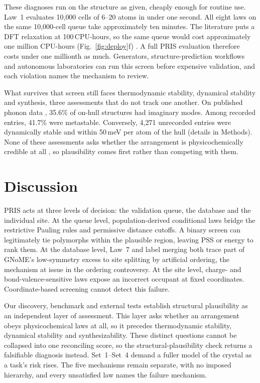 These diagnoses run on the structure as given, cheaply enough for routine use. Law~1
evaluates 10{,}000 cells of 6--20 atoms in under one second. All eight laws on the
same 10{,}000-cell queue take approximately ten minutes. The literature puts a DFT relaxation at 100\,CPU-hours, so the same queue
would cost approximately one million CPU-hours
(Fig.~\ref{fig:deploy}f) \cite{jain2013commentary}. A full PRIS evaluation therefore costs
under one millionth as much. Generators, structure-prediction workflows and autonomous
laboratories can run this screen before expensive validation, and each violation names the
mechanism to review.

What survives that screen still faces thermodynamic stability, dynamical stability and
synthesis, three assessments that do not track one another. On published phonon data
\cite{petretto2018highthroughput,zhu2024highthroughput}, 35.6\% of on-hull structures had
imaginary modes. Among recorded entries, 41.7\% were metastable. Conversely, 4{,}271
unrecorded entries were dynamically stable and within 50\,meV per atom of the hull (details in Methods).
None of these assessments asks whether the arrangement is physicochemically credible at all
\cite{sun2016thermodynamic,aykol2018thermodynamic,antoniuk2023predicting}, so plausibility
comes first rather than competing with them.

\section{Discussion}
\label{sec:ledger}

PRIS acts at three levels of decision: the validation queue, the database and the
individual site. At the queue level, population-derived conditional laws bridge the
restrictive Pauling rules and permissive distance cutoffs. A binary screen can legitimately
tie polymorphs within the plausible region, leaving PSS or energy to rank them. At the database
level, Law~7 and label merging both trace part of GNoME's low-symmetry excess to site
splitting by artificial ordering, the mechanism at issue in the ordering
controversy. At the site level, charge- and bond-valence-sensitive laws expose an incorrect
occupant at fixed coordinates. Coordinate-based screening cannot detect this failure.

Our discovery, benchmark and external tests establish structural plausibility as
an independent layer of assessment. This layer asks whether an arrangement obeys
physicochemical laws at all, so it precedes thermodynamic stability, dynamical
stability and synthesizability. These distinct questions cannot be collapsed into one
reconciling score, so the structural-plausibility check returns a falsifiable diagnosis instead.
Set~1--Set~4 demand a fuller model of the crystal as a task's risk rises. The
five mechanisms remain separate, with no imposed hierarchy, and every unsatisfied law names
the failure mechanism.

